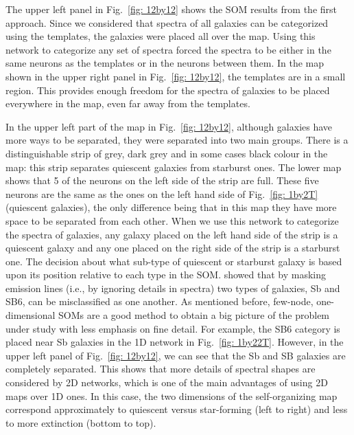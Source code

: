         The upper left panel in Fig.~\ref{fig: 12by12} shows the SOM results from the first approach. 
        Since we considered that spectra of all galaxies can be categorized using the  templates, the galaxies were placed all over the map.
        Using this network to categorize any set of spectra forced the spectra to be either in the same neurons as the  templates or in the neurons between them.
        In the map shown in the upper right panel in Fig.~\ref{fig: 12by12}, the  templates are in a small region. This provides enough freedom for the spectra of galaxies to be placed everywhere in the map, even far away from the templates.
    
    
        In the upper left part of the map in Fig.~\ref{fig: 12by12}, although galaxies have more ways to be separated, they were separated into two main groups.
        There is a distinguishable strip of grey, dark grey and in some cases black colour in the map:
        this strip separates quiescent galaxies from starburst ones.
        The lower map shows that 5 of the neurons on the left side of the strip are full. 
        These five neurons are the same as the ones on the left hand side of Fig.~\ref{fig: 1by2T} (quiescent galaxies),
        the only difference being that in this map they have more space to be separated from each other.
        When we use this network to categorize the spectra of galaxies, any galaxy placed on the left hand side of the strip is a quiescent galaxy and any one placed on the right side of the strip is a starburst one.
        The decision about what sub-type of quiescent or starburst galaxy is based upon its position relative to each type in the SOM.
         showed that by masking emission lines (i.e., by ignoring details in spectra) two types of galaxies, Sb and SB6, can be misclassified as one another.
        As mentioned before, few-node, one-dimensional SOMs are a good method to obtain a big picture of the problem under study with less emphasis on fine detail. 
        For example, the SB6 category is placed near Sb galaxies in the 1D network in Fig.~\ref{fig: 1by22T}.
        However, in the upper left panel of Fig.~\ref{fig: 12by12}, we can see that the Sb and SB galaxies are completely separated. 
        This shows that more details of spectral shapes are considered by 2D networks, which is one of the main advantages of  using 2D maps over 1D ones.
       In this case, the two dimensions of the self-organizing map correspond approximately to quiescent versus star-forming (left to right) and less to more extinction (bottom to top). 
    
